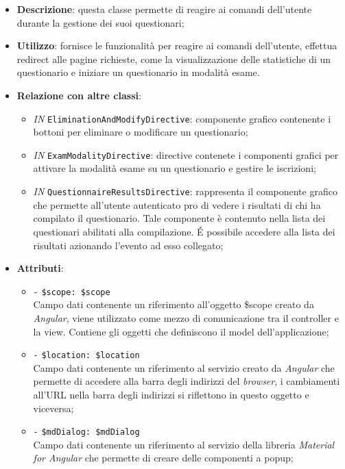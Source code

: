 \begin{itemize}
	\item \textbf{Descrizione}: questa classe permette di reagire ai comandi dell'utente durante la gestione dei suoi questionari;
	\item \textbf{Utilizzo}: fornisce le funzionalità per reagire ai comandi dell'utente, effettua redirect alle pagine richieste, come la visualizzazione delle statistiche di un questionario e iniziare un questionario in modalità esame.
	\item \textbf{Relazione con altre classi}:
	\begin{itemize}
		\item \textit{IN} \texttt{EliminationAndModifyDirective}: componente grafico contenente i bottoni per eliminare o modificare un questionario;  
		\item \textit{IN} \texttt{ExamModalityDirective}: directive contenete i componenti grafici per attivare la modalità esame su un questionario e gestire le iscrizioni;
		\item \textit{IN} \texttt{QuestionnaireResultsDirective}: rappresenta il componente grafico che permette all'utente autenticato pro di vedere i risultati di chi ha compilato il questionario. Tale componente è contenuto nella lista dei questionari abilitati alla compilazione. \'E possibile accedere alla lista dei risultati azionando l'evento ad esso collegato;
	\end{itemize}
	\item \textbf{Attributi}:
	\begin{itemize}
		\item \texttt{-} \texttt{\$scope: \$scope} \\
		Campo dati contenente un riferimento all’oggetto \$scope creato da \textit{Angular}, viene utilizzato come mezzo di comunicazione tra il controller e la view. Contiene gli oggetti che definiscono il model dell’applicazione;
		\item \texttt{-} \texttt{\$location: \$location} \\
		Campo dati contenente un riferimento al servizio creato da \textit{Angular} che permette di accedere alla barra degli indirizzi del \textit{browser}, i cambiamenti all’URL nella barra degli indirizzi si riflettono in questo oggetto e viceversa;
		\item \texttt{-} \texttt{\$mdDialog: \$mdDialog} \\
		Campo dati contenente un riferimento al servizio della libreria \textit{Material for Angular} che permette di creare delle componenti a popup;

\end{itemize}
\end{itemize}
